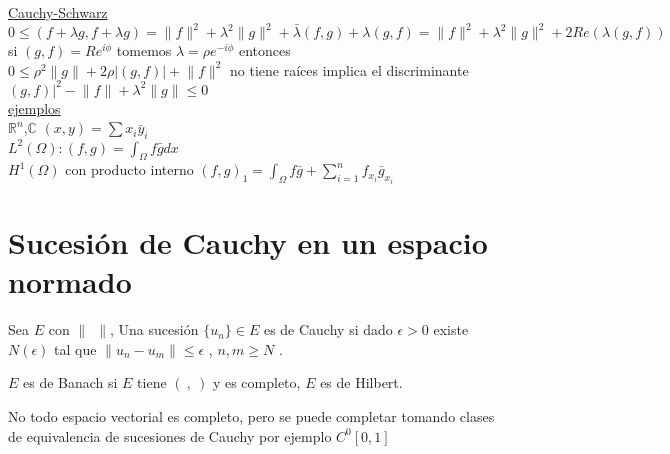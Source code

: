 \documentclass[a4paper,10pt]{book}
\def \ep{\epsilon}
\begin{document}
\underline{Cauchy-Schwarz} \\
$0\leq (f+\lambda g, f + \lambda g) = \lVert f \rVert^2 +\lambda^2\lVert g \rVert^2 + \bar{\lambda} (f,g)+ \lambda (g,f)= \lVert f \rVert^2+ \lambda^2\lVert g \rVert^2 +2 Re (\lambda(g,f))$
si $(g,f)= R e^{i \phi} $ tomemos $\lambda= \rho e^{-i\phi}$  entonces\\
$0\leq \rho^2 \lVert g\rVert +2 \rho | (g,f) | + \lVert f\rVert^2 $
no tiene raíces implica el discriminante \\
$ (g,f) |^2 - \lVert f \rVert+ \lambda^2\lVert g \rVert \leq 0$\\
\underline{ejemplos} \\
$\mathbb{R}^n$,$\mathbb{C}$ $(x,y)= \sum x_i \bar{y}_i$ \\
$L^2(\Omega) : (f,g) =\int_{\Omega} f \bar{g} dx$\\
$H^1(\Omega)$ con producto interno $(f,g)_1 = \int_{\Omega} f\bar{g} + \sum_{i=1}^{n} f_{x_i} \bar{g}_{x_i}$

\section{Sucesión de Cauchy en un espacio normado}
Sea $E$ con $ \lVert \ \ \rVert$, Una sucesión $\{ u_n\}\in E$ es de Cauchy si dado $\epsilon>0$
existe $N(\epsilon)$ tal que $\lVert u_n -u_m\rVert \leq \ep $ , $n,m\geq N$ .

$E$ es de Banach si $E$ tiene $(\ ,\ )$ y es completo, $E$ es de Hilbert.

No todo espacio vectorial es completo, pero se puede completar tomando clases de equivalencia de sucesiones
de Cauchy por ejemplo $C^0[0,1]$    
\end{document}
